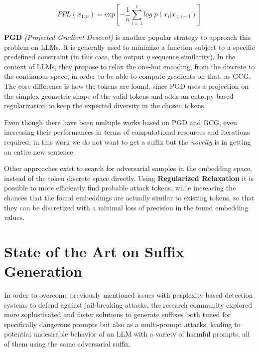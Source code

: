 \documentclass[../thesis]{subfiles}
\begin{document}
\begin{equation}
    PPL(x_{1:n}) = \text{exp} [ -\frac{1}{n} \sum_{i = 1}^t log\;p(x_i | x_{1:i-1}) ]
    \label{eq:perplexity}
\end{equation}

\textbf{PGD} \emph{(Projected Gradient Descent)} \citep{pgd} is another popular strategy to approach this problem on LLMs.
It is generally used to minimize a function subject to a specific predefined constraint (in this case, the output $y$ sequence similarity). In the context of LLMs, they propose to relax the one-hot encoding, from the discrete to the continuous space, in order to be able to compute gradients on that, as GCG. The core difference is how the tokens are found, since PGD uses a projection on the simplex geometric shape of the valid tokens and adds an entropy-based regularization to keep the expected diversity in the chosen tokens.

Even though there have been multiple works based on PGD and GCG, even increasing their performances in terms of computational resources and iterations required, in this work we do not want to get a suffix but the \emph{novelty} is in getting an entire new sentence.

Other approaches exist to search for adversarial samples in the embedding space, instead of the token discrete space directly.
Using \textbf{Regularized Relaxation} \citep{chacko2024adversarialattackslargelanguage-regularizedrelaxation} it is possible to more efficiently find probable attack tokens, while increasing the chances that the found embeddings are actually similar to existing tokens, so that they can be discretized with a minimal loss of precision in the found embedding values.

\section{State of the Art on Suffix Generation}
\label{sec:related_work__sota_suffix_generation}

In order to overcome previously mentioned issues with perplexity-based detection systems to defend against jail-breaking attacks,
the research community explored more sophisticated and faster solutions to generate suffixes both tuned for specifically dangerous prompts but also as a multi-prompt attacks, leading to potential undesirable behavior of an LLM with a variety of harmful prompts, all of them using the same adversarial suffix.
\end{document}
